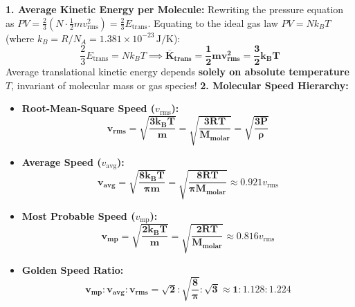 \documentclass[10pt,twoside,openright]{book}
\begin{document}
\begin{formulabox}
\textbf{1. Average Kinetic Energy per Molecule:}
Rewriting the pressure equation as $P V = \frac{2}{3} \left(N \cdot \frac{1}{2}m v_{\text{rms}}^2\right) = \frac{2}{3} E_{\text{trans}}$.
Equating to the ideal gas law $P V = N k_B T$ (where $k_B = R/N_A = 1.381 \times 10^{-23}\,\mathrm{J/K}$):
\begin{equation}
  \frac{2}{3} E_{\text{trans}} = N k_B T \implies \mathbf{\overline{K}_{\text{trans}} = \frac{1}{2}m v_{\text{rms}}^2 = \frac{3}{2}k_B T}
\end{equation}
Average translational kinetic energy depends \textbf{solely on absolute temperature $T$}, invariant of molecular mass or gas species!
\textbf{2. Molecular Speed Hierarchy:}
\begin{itemize}
  \item \textbf{Root-Mean-Square Speed ($v_{\text{rms}}$):}
  \begin{equation}
    \mathbf{v_{\text{rms}} = \sqrt{\frac{3 k_B T}{m}} = \sqrt{\frac{3 R T}{M_{\text{molar}}}} = \sqrt{\frac{3 P}{\rho}}}
  \end{equation}
  \item \textbf{Average Speed ($v_{\text{avg}}$):}
  \begin{equation}
    \mathbf{v_{\text{avg}} = \sqrt{\frac{8 k_B T}{\pi m}} = \sqrt{\frac{8 R T}{\pi M_{\text{molar}}}}} \approx 0.921 v_{\text{rms}}
  \end{equation}
  \item \textbf{Most Probable Speed ($v_{\text{mp}}$):}
  \begin{equation}
    \mathbf{v_{\text{mp}} = \sqrt{\frac{2 k_B T}{m}} = \sqrt{\frac{2 R T}{M_{\text{molar}}}}} \approx 0.816 v_{\text{rms}}
  \end{equation}
  \item \textbf{Golden Speed Ratio:}
  \begin{equation}
    \mathbf{v_{\text{mp}} : v_{\text{avg}} : v_{\text{rms}} = \sqrt{2} : \sqrt{\frac{8}{\pi}} : \sqrt{3} \approx 1 : 1.128 : 1.224}
  \end{equation}
\end{itemize}
\end{formulabox}
\end{document}
